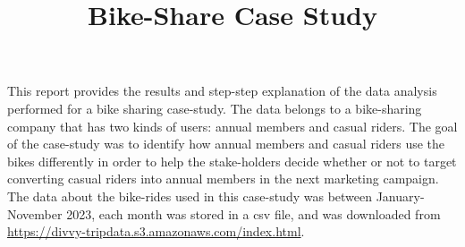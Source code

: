 \documentclass[12pt]{article}
\begin{document}
\title{Bike-Share Case Study}
\date{}
\maketitle

This report provides the results and step-step explanation of the data analysis performed for a bike sharing case-study. The data belongs to a bike-sharing company that has two kinds of users: annual members and casual riders. The goal of the case-study was to identify how annual members and casual riders use the bikes differently in order to help the stake-holders decide whether or not to target converting casual riders into annual members in the next marketing campaign. The data about the bike-rides used in this case-study was between January-November 2023, each month was stored in a csv file, and was downloaded from \url{https://divvy-tripdata.s3.amazonaws.com/index.html}. 
\end{document}
